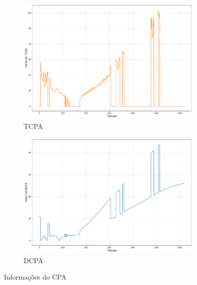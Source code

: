         
        
        \begin{figure}[H]
		\centering
		\begin{subfigure}{0.4\textwidth}
            \centering
            \includegraphics[width=\textwidth]{fig/chap5/headon_tcpa.pdf}
            \caption{TCPA}
            \label{fig:chap5_headon_tcpa}
        \end{subfigure}
		\begin{subfigure}{0.4\textwidth}
            \centering
            \includegraphics[width=\textwidth]{fig/chap5/headon_dcpa.pdf}
            \caption{DCPA}
            \label{fig:chap5_headon_dcpa}
        \end{subfigure}
        
        \caption{Informações do CPA}
        \label{fig:chap5_headon_cpa}
        \end{figure}
        
